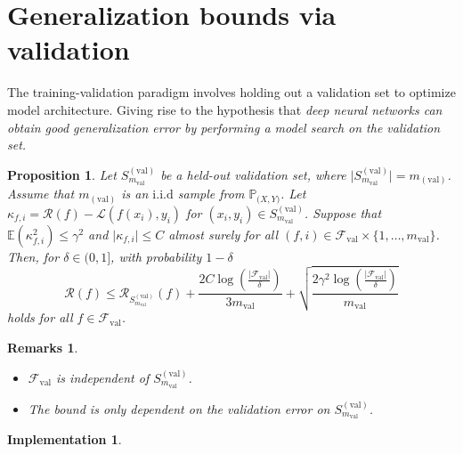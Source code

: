\documentclass[wide]{adonis}
\newtheorem{proposition}[theorem]{Proposition}
\newtheorem{remarks}[theorem]{Remarks}
\newtheorem{implementation}[theorem]{Implementation}
\begin{document}
\section{Generalization bounds via validation}
The training-validation paradigm involves holding out a validation set to optimize model architecture. Giving rise to the hypothesis that \textit{deep neural networks can obtain good generalization error by performing a model search on the validation set.}
\begin{proposition}
    Let $S_{m_{\mathrm{val}}}^{\mathrm{(val)}}$ be a held-out validation set, where $\vert S_{m_{\mathrm{val}}}^{\mathrm{(val)}}\vert=m_{\mathrm{(val)}}$. Assume that $m_{\mathrm{(val)}}$ is an $\mathrm{i.i.d}$ sample from $\mathbb{P}_{\mathcal(X,Y)}$. Let $\kappa_{f,i}=\mathcal{R}(f)-\mathcal{L}(f(x_i),y_i)$ for $(x_i,y_i)\in S_{m_{\mathrm{val}}}^{\mathrm{(val)}}$. Suppose that $\mathbb{E}(\kappa_{f,i}^2)\leq\gamma^2$ and $\vert\kappa_{f,i}\vert\leq C$ almost surely for all $(f,i)\in\mathcal{F}_{\mathrm{val}}\times\{1,\dots,m_{\mathrm{val}}\}$. Then, for $\delta\in(0,1]$, with probability $1-\delta$
    $$\mathcal{R}(f)\leq\mathcal{R}_{S_{m_{\mathrm{val}}}^{\mathrm{(val)}}}(f)+\frac{2C\log\left(\frac{\vert\mathcal{F}_{\mathrm{val}}\vert}{\delta}\right)}{3m_{\mathrm{val}}}+\sqrt{\frac{2\gamma^2\log\left(\frac{\vert\mathcal{F}_{\mathrm{val}}\vert}{\delta}\right)}{m_{\mathrm{val}}}}$$
    holds for all $f\in\mathcal{F}_{\mathrm{val}}$.
\end{proposition}
\begin{remarks}
\
\begin{itemize}
    \item $\mathcal{F}_{\mathrm{val}}$ is independent of $S_{m_{\mathrm{val}}}^{\mathrm{(val)}}$.
    \item The bound is only dependent on the validation error on $S_{m_{\mathrm{val}}}^{\mathrm{(val)}}$.
\end{itemize}
\end{remarks}
\begin{implementation}
    
\end{implementation}
\end{document}
